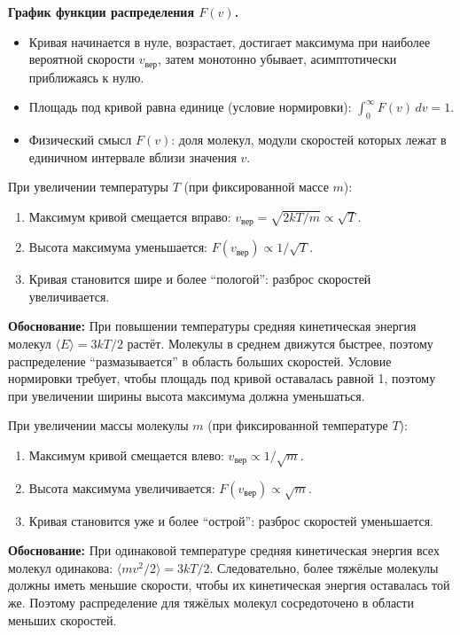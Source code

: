 \begin{remark}
\textbf{График функции распределения $F(v)$.}
\begin{itemize}
    \item Кривая начинается в нуле, возрастает, достигает максимума при наиболее вероятной скорости $v_{\text{вер}}$, затем монотонно убывает, асимптотически приближаясь к нулю.
    \item Площадь под кривой равна единице (условие нормировки): $\int_0^\infty F(v) \, dv = 1$.
    \item Физический смысл $F(v)$: доля молекул, модули скоростей которых лежат в единичном интервале вблизи значения $v$.
\end{itemize}
\end{remark}

\begin{property}
При увеличении температуры $T$ (при фиксированной массе $m$):
\begin{enumerate}
    \item Максимум кривой смещается вправо: $v_{\text{вер}} = \sqrt{2kT/m} \propto \sqrt{T}$.
    \item Высота максимума уменьшается: $F(v_{\text{вер}}) \propto 1/\sqrt{T}$.
    \item Кривая становится шире и более ``пологой'': разброс скоростей увеличивается.
\end{enumerate}
\textbf{Обоснование:} При повышении температуры средняя кинетическая энергия молекул $\langle E \rangle = 3kT/2$ растёт. Молекулы в среднем движутся быстрее, поэтому распределение ``размазывается'' в область больших скоростей. Условие нормировки требует, чтобы площадь под кривой оставалась равной 1, поэтому при увеличении ширины высота максимума должна уменьшаться.
\end{property}

\begin{property}
При увеличении массы молекулы $m$ (при фиксированной температуре $T$):
\begin{enumerate}
    \item Максимум кривой смещается влево: $v_{\text{вер}} \propto 1/\sqrt{m}$.
    \item Высота максимума увеличивается: $F(v_{\text{вер}}) \propto \sqrt{m}$.
    \item Кривая становится уже и более ``острой'': разброс скоростей уменьшается.
\end{enumerate}
\textbf{Обоснование:} При одинаковой температуре средняя кинетическая энергия всех молекул одинакова: $\langle mv^2/2 \rangle = 3kT/2$. Следовательно, более тяжёлые молекулы должны иметь меньшие скорости, чтобы их кинетическая энергия оставалась той же. Поэтому распределение для тяжёлых молекул сосредоточено в области меньших скоростей.
\end{property}

